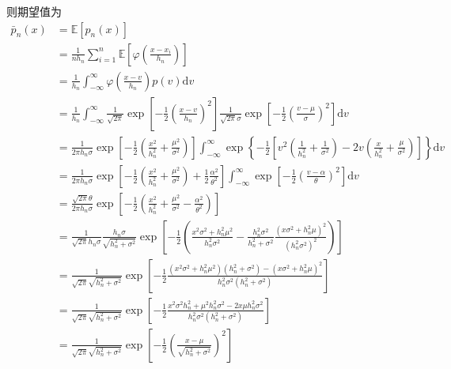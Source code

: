 \documentclass{article}
\begin{document}
则期望值为
\begin{equation}
  \begin{aligned}
    \bar{p}_{n}(x)
    &=\mathbb{E}[p_n(x)]\\
    &=\frac{1}{nh_n}\sum_{i=1}^n\mathbb{E}\left[\varphi\left(\frac{x-x_{i}}{h_{n}}\right)\right]\\
    &=\frac{1}{h_n}\int_{-\infty}^\infty\varphi\left(\frac{x-v}{h_{n}}\right)p(v)\mathrm{d}v\\
    &=\frac{1}{h_n}\int_{-\infty}^\infty\frac{1}{\sqrt{2\pi}}\exp\left[-\frac{1}{2}\left(\frac{x-v}{h_n}\right)^2\right]\frac{1}{\sqrt{2\pi}\sigma}\exp\left[-\frac{1}{2}\left(\frac{v-\mu}{\sigma}\right)^2\right]\mathrm{d}v\\
    &=\frac{1}{2\pi h_n\sigma}\exp\left[-\frac{1}{2}\left(\frac{x^2}{h_n^2}+\frac{\mu^2}{\sigma^2}\right)\right]\int_{-\infty}^\infty\exp\left\{-\frac{1}{2}\left[v^2\left(\frac{1}{h_n^2}+\frac{1}{\sigma^2}\right)-2v\left(\frac{x}{h_n^2}+\frac{\mu}{\sigma^2}\right)\right]\right\}\mathrm{d}v\\
    &=\frac{1}{2\pi h_n\sigma}\exp\left[-\frac{1}{2}\left(\frac{x^2}{h_n^2}+\frac{\mu^2}{\sigma^2}\right)+\frac{1}{2}\frac{\alpha^2}{\theta^2}\right]\int_{-\infty}^\infty\exp\left[-\frac{1}{2}\left(\frac{v-\alpha}{\theta}\right)^2\right]\mathrm{d}v\\
    &=\frac{\sqrt{2\pi}\theta}{2\pi h_n\sigma}\exp\left[-\frac{1}{2}\left(\frac{x^2}{h_n^2}+\frac{\mu^2}{\sigma^2}-\frac{\alpha^2}{\theta^2}\right)\right]\\
    &=\frac{1}{\sqrt{2\pi}h_n\sigma}\frac{h_n\sigma}{\sqrt{h_n^2+\sigma^2}}\exp\left[-\frac{1}{2}\left(\frac{x^2\sigma^2+h_n^2\mu^2}{h_n^2\sigma^2}-\frac{h_n^2\sigma^2}{h_n^2+\sigma^2}\frac{(x\sigma^2+h_n^2\mu)^2}{(h_n^2\sigma^2)^2}\right)\right]\\
    &=\frac{1}{\sqrt{2\pi}\sqrt{h_n^2+\sigma^2}}\exp\left[-\frac{1}{2}\frac{(x^2\sigma^2+h_n^2\mu^2)(h_n^2+\sigma^2)-(x\sigma^2+h_n^2\mu)^2}{h_n^2\sigma^2(h_n^2+\sigma^2)}\right]\\
    &=\frac{1}{\sqrt{2\pi}\sqrt{h_n^2+\sigma^2}}\exp\left[-\frac{1}{2}\frac{x^2\sigma^2h_n^2+\mu^2h_n^2\sigma^2-2x\mu h_n^2\sigma^2}{h_n^2\sigma^2(h_n^2+\sigma^2)}\right]\\
    &=\frac{1}{\sqrt{2\pi}\sqrt{h_n^2+\sigma^2}}\exp\left[-\frac{1}{2}\left(\frac{x-\mu}{\sqrt{h_n^2+\sigma^2}}\right)^2\right]\\
  \end{aligned}
\end{equation}
\end{document}
